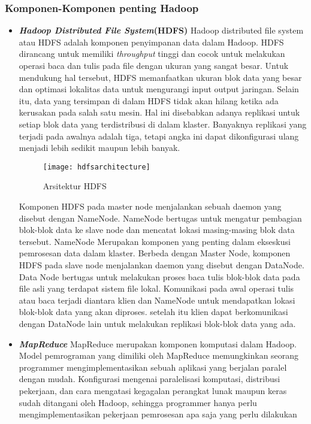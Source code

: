 \subsubsection{Komponen-Komponen penting Hadoop}
\begin{itemize}
	\item[]{\textbf{\textit{Hadoop Distributed File System}(HDFS)}\newline
		Hadoop distributed file system atau HDFS adalah komponen penyimpanan data dalam Hadoop.
		HDFS dirancang untuk memiliki \textit{throughput} tinggi dan cocok untuk melakukan 						operasi baca dan tulis pada file dengan ukuran yang sangat besar. Untuk mendukung hal 					tersebut, HDFS memanfaatkan ukuran blok data yang besar dan optimasi lokalitas data 					untuk mengurangi input output jaringan. Selain itu, data yang tersimpan di dalam HDFS 					tidak akan hilang ketika ada kerusakan pada salah satu mesin. Hal ini disebabkan adanya 				replikasi untuk setiap blok data yang terdistribusi di dalam klaster. Banyaknya 						replikasi yang terjadi pada awalnya adalah tiga, tetapi angka ini dapat dikonfigurasi 					ulang menjadi lebih sedikit maupun lebih banyak.
		
		\begin{figure}[H] 
		\centering  
		\texttt{[image: hdfsarchitecture]}  
		\caption[Gambar Arsitektur HDFS]{Arsitektur HDFS} 
		\label{fig:HDFS Architecture} 
		\end{figure}
		
		Komponen HDFS pada master node menjalankan sebuah daemon yang disebut dengan NameNode. 					NameNode bertugas untuk mengatur pembagian blok-blok data ke slave node dan mencatat 					lokasi masing-masing blok data tersebut. NameNode Merupakan komponen yang penting dalam 				ekseskusi pemrosesan data dalam klaster. Berbeda dengan Master Node, komponen HDFS pada 				slave node menjalankan daemon yang disebut dengan DataNode. Data Node bertugas untuk 					melakukan proses baca tulis blok-blok data pada file asli yang terdapat sistem file 					lokal. Komunikasi pada awal operasi tulis atau baca terjadi diantara klien dan NameNode 				untuk mendapatkan lokasi blok-blok data yang akan diproses. setelah itu klien dapat 					berkomunikasi dengan DataNode lain untuk melakukan replikasi blok-blok data yang ada. 
	}
	
	\item[]{\textbf{\textit{MapReduce}}\newline
	MapReduce merupakan komponen komputasi dalam Hadoop. Model pemrograman yang dimiliki
	oleh MapReduce memungkinkan seorang programmer mengimplementasikan sebuah aplikasi yang
	berjalan paralel dengan mudah. Konfigurasi mengenai paralelisasi komputasi, distribusi 					pekerjaan, dan cara mengatasi kegagalan perangkat lunak maupun keras sudah ditangani oleh 				Hadoop, sehingga programmer hanya perlu mengimplementasikan pekerjaan pemrosesan apa saja yang 			perlu dilakukan
	
}
\end{itemize}
